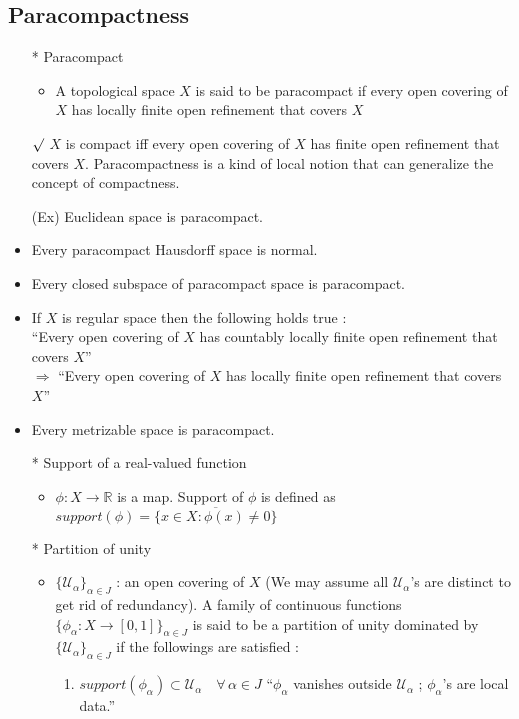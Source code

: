 \documentclass[12pt]{article}
\newcommand{\rmk}{$\surd$}
\newcommand{\Real}{\mathbb{R}}
\newcommand{\U}{\mathcal{U}}
\newcommand{\cl}{\overline}
\begin{document}
\subsection{Paracompactness}
\smallskip
\begin{itemize}
    \item[*] Paracompact
    \begin{itemize}
        \item A topological space $X$ is said to be paracompact if every open covering of $X$ has locally finite open refinement that covers $X$
    \end{itemize}
    \item[\rmk] $X$ is compact iff every open covering of $X$ has finite open refinement that covers $X$. Paracompactness is a kind of local notion that can generalize the concept of compactness.
    \item[(Ex)] Euclidean space is paracompact.
    \item Every paracompact Hausdorff space is normal.
    \item Every closed subspace of paracompact space is paracompact.
    \item If $X$ is regular space then the following holds true :
    \\``Every open covering of $X$ has countably locally finite open refinement that covers $X$'' \\$\Rightarrow$ ``Every open covering of $X$ has locally finite open refinement that covers $X$''
    \item Every metrizable space is paracompact.
    \item[*] Support of a real-valued function
    \begin{itemize}
        \item $\phi : X\rightarrow \Real$ is a map. Support of $\phi$ is defined as $support(\phi)=\cl{\{x\in X : \phi(x)\neq 0\}}$
    \end{itemize}
    \item[*] Partition of unity
    \begin{itemize}
        \item $\{\U_\alpha\}_{\alpha\in J}$ : an open covering of $X$ (We may assume all $\U_\alpha$'s are distinct to get rid of redundancy). A family of continuous functions $\{\phi_\alpha : X\rightarrow [0,1]\}_{\alpha\in J}$ is said to be a partition of unity dominated by $\{\U_\alpha\}_{\alpha\in J}$ if the followings are satisfied : 
        \begin{enumerate}
            \item $support(\phi_\alpha)\subset \U_\alpha \quad \forall \, \alpha\in J$  \quad ``$\phi_\alpha$ vanishes outside $\U_\alpha$ ; $\phi_\alpha$'s are local data.''

\end{enumerate}
\end{itemize}
\end{itemize}
\end{document}
